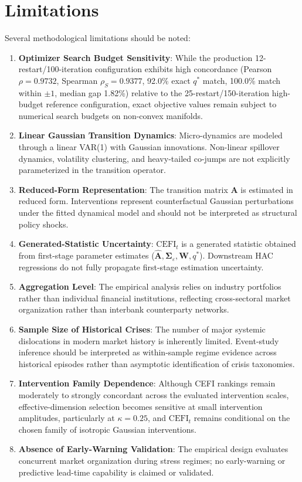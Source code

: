 \documentclass[review,12pt,authoryear]{elsarticle}
\begin{document}
\section{Limitations}
\label{sec:limitations}

Several methodological limitations should be noted:
\begin{enumerate}
    \item \textbf{Optimizer Search Budget Sensitivity}: While the production 12-restart/100-iteration configuration exhibits high concordance (Pearson $\rho = 0.9732$, Spearman $\rho_S = 0.9377$, 92.0\% exact $q^*$ match, 100.0\% match within $\pm 1$, median gap 1.82\%) relative to the 25-restart/150-iteration high-budget reference configuration, exact objective values remain subject to numerical search budgets on non-convex manifolds.
    \item \textbf{Linear Gaussian Transition Dynamics}: Micro-dynamics are modeled through a linear VAR(1) with Gaussian innovations. Non-linear spillover dynamics, volatility clustering, and heavy-tailed co-jumps are not explicitly parameterized in the transition operator.
    \item \textbf{Reduced-Form Representation}: The transition matrix $\mathbf{A}$ is estimated in reduced form. Interventions represent counterfactual Gaussian perturbations under the fitted dynamical model and should not be interpreted as structural policy shocks.
    \item \textbf{Generated-Statistic Uncertainty}: $\mathrm{CEFI}_t$ is a generated statistic obtained from first-stage parameter estimates ($\hat{\mathbf{A}}, \boldsymbol{\Sigma}_\varepsilon, \mathbf{W}, q^*$). Downstream HAC regressions do not fully propagate first-stage estimation uncertainty.
    \item \textbf{Aggregation Level}: The empirical analysis relies on industry portfolios rather than individual financial institutions, reflecting cross-sectoral market organization rather than interbank counterparty networks.
    \item \textbf{Sample Size of Historical Crises}: The number of major systemic dislocations in modern market history is inherently limited. Event-study inference should be interpreted as within-sample regime evidence across historical episodes rather than asymptotic identification of crisis taxonomies.
    \item \textbf{Intervention Family Dependence}: Although CEFI rankings remain moderately to strongly concordant across the evaluated intervention scales, effective-dimension selection becomes sensitive at small intervention amplitudes, particularly at $\kappa = 0.25$, and $\mathrm{CEFI}_t$ remains conditional on the chosen family of isotropic Gaussian interventions.
    \item \textbf{Absence of Early-Warning Validation}: The empirical design evaluates concurrent market organization during stress regimes; no early-warning or predictive lead-time capability is claimed or validated.
\end{enumerate}
\end{document}
